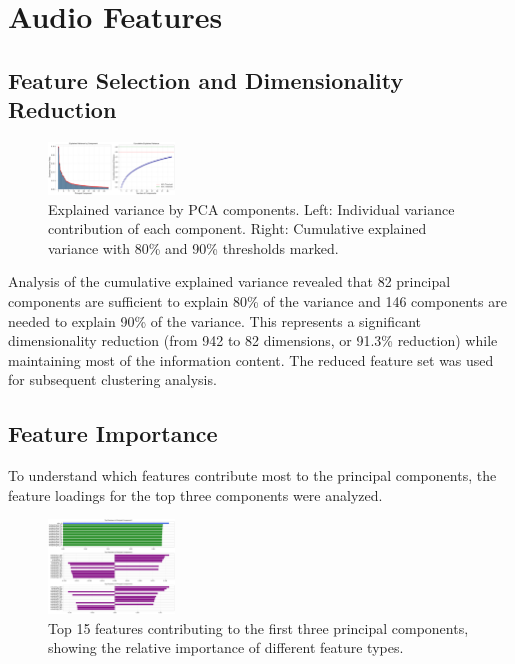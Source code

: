 \documentclass{article}
\begin{document}
\section{Audio Features}
\label{sec:audio_features}

\subsection{Feature Selection and Dimensionality Reduction}

\begin{figure}[H]
  \centering
  \includegraphics[width=0.3\textwidth]{figures/audio_features/pca_explained_variance.png}
  \caption{Explained variance by PCA components. Left: Individual variance contribution of each component. Right: Cumulative explained variance with 80\% and 90\% thresholds marked.}
  \label{fig:pca_variance}
\end{figure}

Analysis of the cumulative explained variance revealed that 82 principal components are sufficient to explain 80\% of the variance and 146 components are needed to explain 90\% of the variance. This represents a significant dimensionality reduction (from 942 to 82 dimensions, or 91.3\% reduction) while maintaining most of the information content. The reduced feature set was used for subsequent clustering analysis.

\subsection{Feature Importance}

To understand which features contribute most to the principal components, the feature loadings for the top three components were analyzed.

\begin{figure}[H]
  \centering
  \includegraphics[width=0.3\textwidth]{figures/audio_features/feature_importance.png}
  \caption{Top 15 features contributing to the first three principal components, showing the relative importance of different feature types.}
  \label{fig:feature_importance}
\end{figure}
\end{document}
